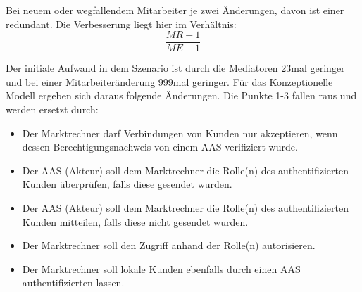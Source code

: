\documentclass[11pt,a4paper]{report}
\begin{document}
Bei neuem oder wegfallendem Mitarbeiter je zwei Änderungen, davon ist einer redundant. Die Verbesserung liegt hier im Verhältnis:
\[
	\frac{MR-1}{ME-1}
\]

Der initiale Aufwand in dem Szenario ist durch die Mediatoren 23mal geringer und bei einer Mitarbeiteränderung 999mal geringer. Für das Konzeptionelle Modell ergeben sich daraus folgende Änderungen. Die Punkte 1-3 fallen raus und werden ersetzt durch:

\begin{itemize}[leftmargin=*]
\item Der Marktrechner darf Verbindungen von Kunden nur akzeptieren, wenn dessen Berechtigungsnachweis von einem AAS verifiziert wurde.
\item Der AAS (Akteur) soll dem Marktrechner die Rolle(n) des authentifizierten Kunden überprüfen, falls diese gesendet wurden.
\item Der AAS (Akteur) soll dem Marktrechner die Rolle(n) des authentifizierten Kunden mitteilen, falls diese nicht gesendet wurden.
\item Der Marktrechner soll den Zugriff anhand der Rolle(n) autorisieren.
\item Der Marktrechner soll lokale Kunden ebenfalls durch einen AAS authentifizierten lassen.
\end{itemize}
\end{document}
